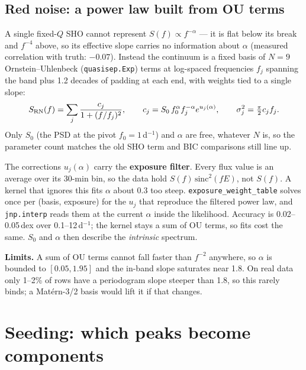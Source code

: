 \documentclass[11pt]{article}
\newcommand{\code}[1]{\texttt{#1}}
\begin{document}
\subsection{Red noise: a power law built from OU terms}

A single fixed-$Q$ SHO cannot represent $S(f) \propto f^{-\alpha}$ --- it is flat below its
break and $f^{-4}$ above, so its effective slope carries no information about $\alpha$
(measured correlation with truth: $-0.07$). Instead the continuum is a fixed basis of $N=9$
Ornstein--Uhlenbeck (\code{quasisep.Exp}) terms at log-spaced frequencies $f_j$ spanning the
band plus 1.2 decades of padding at each end, with weights tied to a single slope:
\begin{equation}
S_{\rm RN}(f) = \sum_j \frac{c_j}{1 + (f/f_j)^2},
\qquad c_j = S_0\,f_0^{\alpha} f_j^{-\alpha} e^{u_j(\alpha)},
\qquad \sigma_j^2 = \tfrac{\pi}{2} c_j f_j .
\end{equation}
Only $S_0$ (the PSD at the pivot $f_0 = 1$\,d$^{-1}$) and $\alpha$ are free, whatever $N$ is,
so the parameter count matches the old SHO term and BIC comparisons still line up.

The corrections $u_j(\alpha)$ carry the \textbf{exposure filter}. Every flux value is an
average over its 30-min bin, so the data hold $S(f)\,\mathrm{sinc}^2(fE)$, not $S(f)$. A
kernel that ignores this fits $\alpha$ about 0.3 too steep. \code{exposure\_weight\_table}
solves once per (basis, exposure) for the $u_j$ that reproduce the filtered power law, and
\code{jnp.interp} reads them at the current $\alpha$ inside the likelihood. Accuracy is
0.02--0.05\,dex over 0.1--12\,d$^{-1}$; the kernel stays a sum of OU terms, so fits cost the
same. $S_0$ and $\alpha$ then describe the \emph{intrinsic} spectrum.

\textbf{Limits.} A sum of OU terms cannot fall faster than $f^{-2}$ anywhere, so
$\alpha$ is bounded to $[0.05, 1.95]$ and the in-band slope saturates near 1.8. On real data
only 1--2\% of rows have a periodogram slope steeper than 1.8, so this rarely binds; a
Mat\'ern-3/2 basis would lift it if that changes.

\section{Seeding: which peaks become components}
\end{document}
